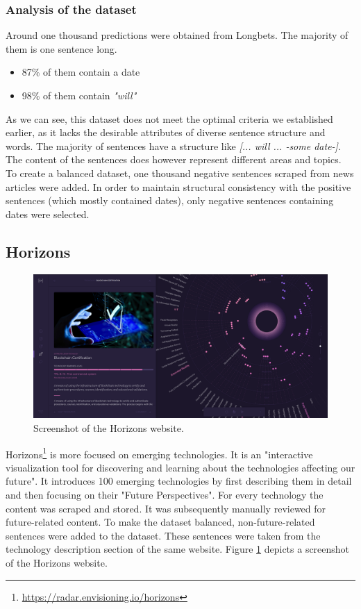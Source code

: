 \documentclass[12pt,oneside,bibtotoc,liststotoc]{scrbook}
\begin{document}
\subsubsection{Analysis of the dataset}
Around one thousand predictions were obtained from Longbets. The majority of them is one sentence long.
\begin{itemize}
  \item 87\% of them contain a date
  \item 98\% of them contain \textit{"will"}
\end{itemize}

As we can see, this dataset does not meet the optimal criteria we established earlier, as it lacks the desirable attributes of diverse sentence structure and words. The majority of sentences have a structure like \textit{[... will ... -some date-]}. The content of the sentences does however represent different areas and topics.
To create a balanced dataset, one thousand negative sentences scraped from news articles were added. In order to maintain structural consistency with the positive sentences (which mostly contained dates), only negative sentences containing dates were selected.



\subsection{Horizons}
\begin{figure}
  \centering
  \includegraphics[width=16cm]{img/horizons.png}
  \caption{Screenshot of the Horizons website.}
  \label{fig:horizons}
\end{figure}
Horizons\footnote{\url{https://radar.envisioning.io/horizons}} is more focused on emerging technologies. It is an "interactive visualization tool for discovering and learning about the technologies affecting our future". It introduces 100 emerging technologies by first describing them in detail and then focusing on their "Future Perspectives". For every technology the content was scraped and stored. It was subsequently manually reviewed for future-related content.
To make the dataset balanced, non-future-related sentences were added to the dataset. These sentences were taken from the technology description section of the same website. Figure \ref{fig:horizons} depicts a screenshot of the Horizons website.
\end{document}
